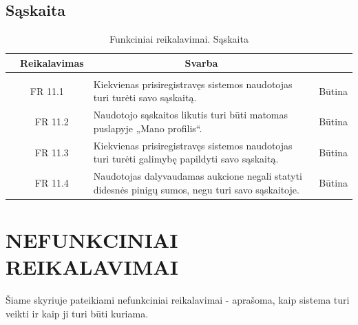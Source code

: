 \documentclass{VUMIFPSkursinis}
\begin{document}
	\subsection{Sąskaita}
	\begin{table}[H]
		\caption{Funkciniai reikalavimai. Sąskaita}
		\begin{tabular}{|p{1cm}|p{1cm}|p{}|p{}|}
			\hline
			\rowcolor{gray!50}
			\multicolumn{2}{|c|}{{\bfseries Kodas}}&
			\multicolumn{1}{c|}{{\bfseries Reikalavimas}}&
			\multicolumn{1}{c|}{{\bfseries Svarba}}\\
			\hline
			\rowcolor{lightgray}
			\multicolumn{4}{|c|}{Sąskaita}\\
			\hline
			\multicolumn{2}{|c|}{FR 11.1}&
			{Kiekvienas prisiregistravęs sistemos naudotojas turi turėti savo sąskaitą.
			}&
			\multicolumn{1}{c|}{Būtina}\\
			\hline
			\multicolumn{1}{|c}{}&
			\multicolumn{1}{c|}{FR 11.2}&
			{Naudotojo sąskaitos likutis turi būti matomas puslapyje „Mano profilis“.
			}&
			\multicolumn{1}{c|}{Būtina}\\
			\hline
			\multicolumn{1}{|c}{}&
			\multicolumn{1}{c|}{FR 11.3}&
			{Kiekvienas prisiregistravęs sistemos naudotojas turi turėti galimybę papildyti savo sąskaitą.
			}&
			\multicolumn{1}{c|}{Būtina}\\
			\hline
			\multicolumn{1}{|c}{}&
			\multicolumn{1}{c|}{FR 11.4}&
			{Naudotojas dalyvaudamas aukcione negali statyti didesnės pinigų sumos, negu turi savo sąskaitoje.
			}&
			\multicolumn{1}{c|}{Būtina}\\
			\hline
		\end{tabular}
	\end{table}
	\newpage

	\section{NEFUNKCINIAI REIKALAVIMAI}
	Šiame skyriuje pateikiami nefunkciniai reikalavimai - aprašoma, kaip sistema turi veikti ir kaip ji turi būti kuriama.
\end{document}
